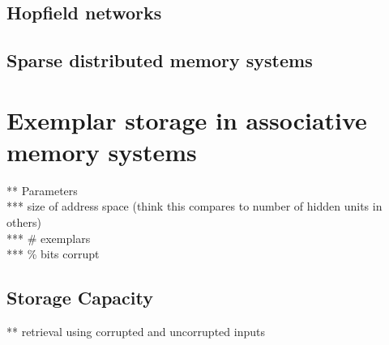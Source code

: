 \documentclass[10pt,letterpaper]{article}
\begin{document}
\cite{Keeler1988}

\subsection{Hopfield networks}
\cite{Hopfield1982}





\subsection{Sparse distributed memory systems}
\cite{Kanerva1988,Kanerva1993}



\section{Exemplar storage in associative memory systems}

** Parameters \\
*** size of address space (think this compares to number of hidden units in others) \\
*** \# exemplars \\
*** \% bits corrupt \\

\subsection{Storage Capacity}
** retrieval using corrupted and uncorrupted inputs \\
\end{document}
